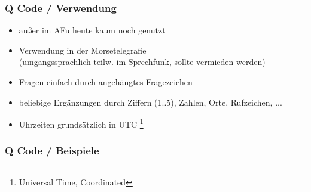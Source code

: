 \begin{frame}
    \frametitle{Q Code / Verwendung}

    \begin{itemize}
        \item außer im AFu heute kaum noch genutzt
        \item Verwendung in der Morsetelegrafie \\
              (umgangssprachlich teilw. im Sprechfunk, sollte vermieden werden)
        \item Fragen einfach durch angehängtes Fragezeichen
        \item beliebige Ergänzungen durch Ziffern (1..5), Zahlen, Orte, Rufzeichen, ...
        \item Uhrzeiten grundsätzlich in UTC
              \footnote{\tiny Universal Time, Coordinated}
    \end{itemize}
    
\end{frame}

\begin{frame}
    \frametitle{Q Code / Beispiele}




    

\end{frame}

